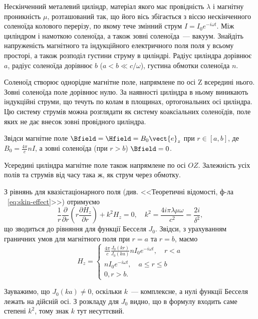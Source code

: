 \begin{problem}\label{prb:Bat379}%
Нескінченний металевий циліндр, матеріал якого має провідність $\lambda$ і магнітну проникність $\mu$, розташований так, що його вісь збігається з віссю нескінченного соленоїда колового перерізу, по якому тече змінний струм $I = I_0e^{-i\omega t}$. Між циліндром і намоткою соленоїда, а також зовні соленоїда~--- вакуум. Знайдіть напруженість магнітного та індукційного електричного поля поля у всьому просторі, а також розподіл густини струму в циліндрі. Радіус циліндра дорівнює $a$, радіус соленоїда дорівнює $b$ ($a<b \ll c/\omega$), густина обмотки соленоїда $n$.
\begin{solution}
	Соленоїд створює однорідне магнітне поле, напрямлене по осі Z  всередині нього. Зовні соленоїда поле дорівнює нулю. За наявності циліндра в ньому виникають індукційні струми, що течуть по колам в площинах, ортогональних осі циліндра. Цю систему струмів можна розглядати як систему коаксіальних соленоїдів, поле яких не дає внесок зовні провідного  циліндра.

	Звідси магнітне поле $\Bfield = \Hfield = B_0\vect{e}_z$ при $r \in [a,b]$, де $B_0 = \frac{4\pi}{c}nI$, а зовні соленоїда (при $r > b$) $\Bfield = 0$.

	Усередині циліндра магнітне поле також напрямлене по осі $OZ$. Залежність усіх полів та струмів від часу така ж, як струм через обмотку.

	З рівнянь для квазістаціонарного поля (див. <<Теоретичні відомості, ф-ла ~\eqref{eq:skin-effect}>>) отримуємо
	\[
		\frac{1}{r}\frac{\partial }{{\partial r}}\left( {r\frac{{\partial {H_z}}}{{\partial r}}} \right) + {k^2}{H_z} = 0, \quad k^2 = \frac{4i\pi\lambda\mu\omega}{c^2} = \frac{2i}{\delta^2},
	\]
	що зводиться до рівняння для функції Бесселя $J_0$. Звідси, з урахуванням граничних умов для магнітного поля при $r = a$  та $r = b$, маємо
	\[H_z =
		\begin{cases}
			\frac{4\pi}{c}\frac{J_0(kr)}{J_0(ka)}nI_0e^{-i\omega t}, \quad r <a \\
			nI_0e^{-i\omega t}, \quad a \le r \le b                             \\
			0, r > b.
		\end{cases}
	\]

	Зауважимо, що $J_0(ka) \neq 0$, оскільки  $k$~--- комплексне, а нулі функції Бесселя лежать на дійсній осі.  З розкладу для  $J_0$  видно, що в формулу входить саме степені $k^2$, тому знак $k$ тут несуттєвий.


\end{solution}
\end{problem}
